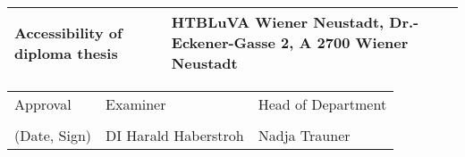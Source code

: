 \begin{center}
    \vspace{5mm}
    
    \begin{tabular}{| m{8cm} | m{8cm} |}
        \hline
        Accessibility of diploma thesis & HTBLuVA Wiener Neustadt, Dr.-Eckener-Gasse 2, A 2700 Wiener Neustadt\\ 
        \hline
    \end{tabular}
    
    \vspace{5mm}
    
    \begin{tabular}{| m{5cm} | m{6cm} | m{5cm} |}
        \hline
        Approval & Examiner & Head of Department\\
        &&\\
        (Date, Sign) & DI Harald Haberstroh & Nadja Trauner\\ %
        \hline
    \end{tabular}
    
    \end{center}